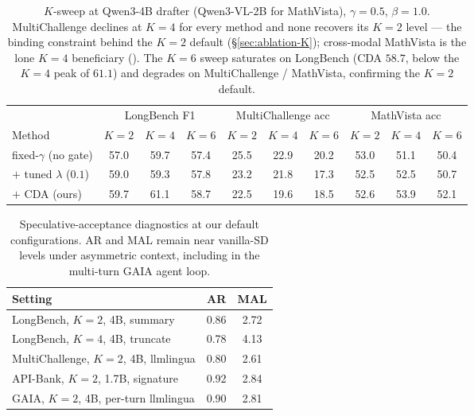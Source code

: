\documentclass[11pt]{article}
\theoremstyle{plain}
\theoremstyle{definition}
\begin{document}
\begin{table}[!h]
\centering
\footnotesize
\setlength{\tabcolsep}{3pt}
\begin{tabular}{lccccccccc}
\toprule
& \multicolumn{3}{c}{LongBench F1} & \multicolumn{3}{c}{MultiChallenge acc} & \multicolumn{3}{c}{MathVista acc} \\
\cmidrule(lr){2-4}\cmidrule(lr){5-7}\cmidrule(lr){8-10}
Method & $K{=}2$ & $K{=}4$ & $K{=}6$ & $K{=}2$ & $K{=}4$ & $K{=}6$ & $K{=}2$ & $K{=}4$ & $K{=}6$ \\
\midrule
fixed-$\gamma$ (no gate) & 57.0 & 59.7 & 57.4  & 25.5 & 22.9 & 20.2  & 53.0 & 51.1 & 50.4  \\
$+$ tuned $\lambda$ ($0.1$)  & 59.0 & 59.3 & 57.8  & 23.2 & 21.8 & 17.3  & 52.5 & 52.5 & 50.7  \\
$+$ CDA (ours)           & 59.7 & 61.1 & 58.7 & 22.5 & 19.6 & 18.5  & 52.6 & 53.9 & 52.1  \\
\bottomrule
\end{tabular}
\caption{$K$-sweep at Qwen3-4B drafter (Qwen3-VL-2B for MathVista), $\gamma{=}0.5$, $\beta{=}1.0$. MultiChallenge declines at $K{=}4$ for every method and none recovers its $K{=}2$ level --- the binding constraint behind the $K{=}2$ default (\S\ref{sec:ablation-K}); cross-modal MathVista is the lone $K{=}4$ beneficiary (). The $K{=}6$ sweep saturates on LongBench (CDA $58.7$, below the $K{=}4$ peak of $61.1$) and degrades on MultiChallenge / MathVista, confirming the $K{=}2$ default.}
\label{tab:k_sweep}
\end{table}

\begin{table}[!h]
\centering
\footnotesize
\setlength{\tabcolsep}{6pt}
\begin{tabular}{lcc}
\toprule
Setting & AR & MAL \\
\midrule
LongBench, $K{=}2$, 4B, summary       & 0.86 & 2.72 \\
LongBench, $K{=}4$, 4B, truncate      & 0.78 & 4.13 \\
MultiChallenge, $K{=}2$, 4B, llmlingua & 0.80 & 2.61 \\
API-Bank, $K{=}2$, 1.7B, signature    & 0.92 & 2.84 \\
GAIA, $K{=}2$, 4B, per-turn llmlingua & 0.90 & 2.81 \\
\bottomrule
\end{tabular}
\caption{Speculative-acceptance diagnostics at our default configurations. AR and MAL remain near vanilla-SD levels under asymmetric context, including in the multi-turn GAIA agent loop.}
\label{tab:accept_dyn}
\end{table}
\end{document}

